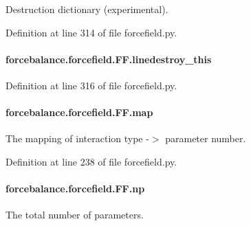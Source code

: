 Destruction dictionary (experimental). 



Definition at line 314 of file forcefield.\-py.

\hypertarget{classforcebalance_1_1forcefield_1_1FF_ab2ca57079cb49527775d044a2b2db6db}{
\paragraph[{linedestroy\-\_\-this}]{\setlength{\rightskip}{0pt plus 5cm}forcebalance.\-forcefield.\-F\-F.\-linedestroy\-\_\-this}}\label{classforcebalance_1_1forcefield_1_1FF_ab2ca57079cb49527775d044a2b2db6db}


Definition at line 316 of file forcefield.\-py.

\hypertarget{classforcebalance_1_1forcefield_1_1FF_adac6add3391d052c319902ccc8e0a617}{
\paragraph[{map}]{\setlength{\rightskip}{0pt plus 5cm}forcebalance.\-forcefield.\-F\-F.\-map}}\label{classforcebalance_1_1forcefield_1_1FF_adac6add3391d052c319902ccc8e0a617}


The mapping of interaction type -\/$>$ parameter number. 



Definition at line 238 of file forcefield.\-py.

\hypertarget{classforcebalance_1_1forcefield_1_1FF_a19eb80acc94a49f9ff806f13a95fef66}{
\paragraph[{np}]{\setlength{\rightskip}{0pt plus 5cm}forcebalance.\-forcefield.\-F\-F.\-np}}\label{classforcebalance_1_1forcefield_1_1FF_a19eb80acc94a49f9ff806f13a95fef66}


The total number of parameters. 



